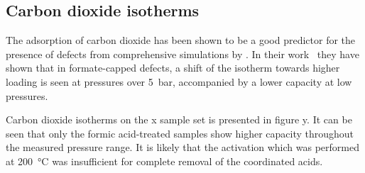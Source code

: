 
\subsection{Carbon dioxide isotherms}\label{def:co2}

The adsorption of carbon dioxide has been shown to be a good 
predictor for the presence of defects from comprehensive simulations
by \citeauthor{thorntonDefectsMetalOrganic2016}.
In their work~\cite{thorntonDefectsMetalOrganic2016} they have shown
that in formate-capped defects, a shift of the  isotherm towards
higher loading is seen at pressures over \SI{5}{\bar}, accompanied 
by a lower capacity at low pressures.

Carbon dioxide isotherms on the x sample set is presented in 
figure y. It can be seen that only the formic acid-treated
samples show higher capacity throughout the measured pressure range.
It is likely that the activation which was performed at 
\SI{200}{\degreeCelsius} was insufficient for complete removal of
the coordinated acids.